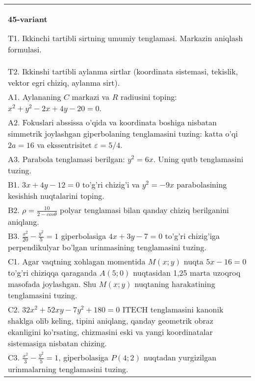 \documentclass{article}
\begin{document}
\begin{tabular}{m{17cm}}
\textbf{45-variant}
\newline

T1. Ikkinchi tartibli sirtning umumiy tenglamasi. Markazin aniqlash formulasi.\\

T2. Ikkinshi tartibli aylanma sirtlar (koordinata sistemasi, tekislik, vektor egri chiziq, aylanma sirt).\\

A1. Aylananing $C$ markazi va $R$ radiusini toping: $x^2+y^2-2x+4y-20=0$.\\

A2. Fokuslari abssissa o'qida va koordinata boshiga nisbatan simmetrik joylashgan giperbolaning tenglamasini tuzing: katta o'qi $2a=16$ va ekssentrisitet $\varepsilon=5/4$.\\

A3. Parabola tenglamasi berilgan: $y^2=6x$. Uning qutb tenglamasini tuzing.\\

B1. $3x + 4y - 12 = 0$ to'g'ri chizig'i va $y^{2} = - 9x$ parabolasining kesishish nuqtalarini toping.\\

B2. $\rho = \frac{10}{2 - cos\theta}$ polyar tenglamasi bilan qanday chiziq berilganini aniqlang.  \\

B3. $\frac{x^{2}}{20} - \frac{y^{2}}{5} = 1$ giperbolasiga $4x + 3y - 7 = 0$ to'g'ri chizig'iga perpendikulyar bo'lgan urinmasining tenglamasini tuzing.  \\

C1. Agar vaqtning xohlagan momentida $M(x;y)$ nuqta $5x - 16 = 0$ to'g'ri chiziqqa qaraganda $A(5;0)$ nuqtasidan 1,25 marta uzoqroq masofada joylashgan. Shu $M(x;y)$ nuqtaning harakatining tenglamasini tuzing.  \\

C2. $32x^{2} + 52xy - 7y^{2} + 180 = 0$ ITECH tenglamasini kanonik shaklga olib keling, tipini aniqlang, qanday geometrik obraz ekanligini ko'rsating, chizmasini eski va yangi koordinatalar sistemasiga nisbatan chizing.  \\

C3. $\frac{x^{2}}{3} - \frac{y^{2}}{5} = 1$, giperbolasiga $P(4;2)$ nuqtadan yurgizilgan urinmalarning tenglamasini tuzing.  \\

\end{tabular}
\vspace{1cm}
\end{document}

